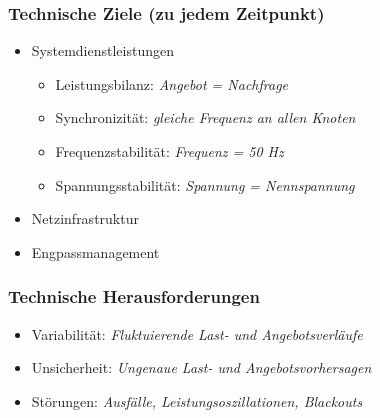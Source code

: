     \subsubsection{Technische Ziele (zu jedem Zeitpunkt)}
        \begin{itemize}
            \item Systemdienstleistungen
            \begin{itemize}
                \item Leistungsbilanz: \textit{Angebot = Nachfrage}
                \item Synchronizität: \textit{gleiche Frequenz an allen Knoten}
                \item Frequenzstabilität: \textit{Frequenz = 50 Hz}
                \item Spannungsstabilität: \textit{Spannung = Nennspannung}
            \end{itemize}
            \item Netzinfrastruktur
            \item Engpassmanagement
        \end{itemize}

    \subsubsection{Technische Herausforderungen}
        \begin{itemize}
            \item Variabilität: \textit{Fluktuierende Last- und Angebotsverläufe}
            \item Unsicherheit: \textit{Ungenaue Last- und Angebotsvorhersagen}
            \item Störungen: \textit{Ausfälle, Leistungsoszillationen, Blackouts}
        \end{itemize}


